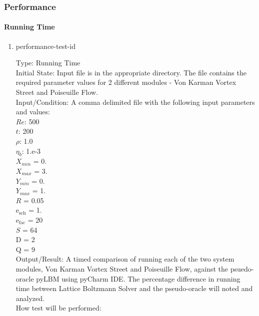 \documentclass[12pt, titlepage]{article}
\newcommand{\famname}{Lattice Boltzmann Solver}
\newcounter{testcounter} %
\begin{document}
\subsubsection{Performance}
		
\paragraph{Running Time}

\begin{enumerate}

\item{performance-test-id\thetestcounter \\}

Type: Running Time\\
					
Initial State: Input file is in the appropriate directory. The file contains the required parameter values for 2 different modules - Von Karman Vortex Street and Poiseuille Flow.\\
					
Input/Condition: A comma delimited file with the following input parameters and values:\\
$Re$: 500\\
$t$: 200\\
$\rho$: 1.0\\
$\eta_b$: 1.e-3\\
$X_{min}$ = 0.\\
$X_{max}$ = 3.\\
$Y_{min}$ = 0.\\
$Y_{max}$ = 1.\\
$R$ = 0.05\\
$\mathrm{e_{sch}}$ = 1.\\
$\mathrm{e_{fac}}$ = 20\\
$S$ = 64\\
$\mathrm{D}$ = 2\\
$\mathrm{Q}$ = 9\\
					
Output/Result: A timed comparison of running
each of the two system modules, Von Karman Vortex Street and Poiseuille Flow, against the psuedo-oracle pyLBM using pyCharm IDE. The percentage difference in running time between {\famname} and the pseudo-oracle will noted and analyzed.\\

How test will be performed: 


\end{enumerate}
\end{document}
